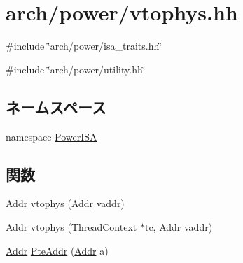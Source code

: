 \hypertarget{power_2vtophys_8hh}{
\section{arch/power/vtophys.hh}
\label{power_2vtophys_8hh}
}
{\ttfamily \#include \char`\"{}arch/power/isa\_\-traits.hh\char`\"{}}\par
{\ttfamily \#include \char`\"{}arch/power/utility.hh\char`\"{}}\par
\subsection*{ネームスペース}
\begin{DoxyCompactItemize}
\item 
namespace \hyperlink{namespacePowerISA}{PowerISA}
\end{DoxyCompactItemize}
\subsection*{関数}
\begin{DoxyCompactItemize}
\item 
\hyperlink{base_2types_8hh_af1bb03d6a4ee096394a6749f0a169232}{Addr} \hyperlink{namespacePowerISA_a3828815371ad2b0a1be60abdcb405cf9}{vtophys} (\hyperlink{base_2types_8hh_af1bb03d6a4ee096394a6749f0a169232}{Addr} vaddr)
\item 
\hyperlink{base_2types_8hh_af1bb03d6a4ee096394a6749f0a169232}{Addr} \hyperlink{namespacePowerISA_ad4bbbca3210dee66152520984c3aac6a}{vtophys} (\hyperlink{classThreadContext}{ThreadContext} $\ast$tc, \hyperlink{base_2types_8hh_af1bb03d6a4ee096394a6749f0a169232}{Addr} vaddr)
\item 
\hyperlink{base_2types_8hh_af1bb03d6a4ee096394a6749f0a169232}{Addr} \hyperlink{namespacePowerISA_a4e1f8d20048a1b7de1f6df74adbc22f3}{PteAddr} (\hyperlink{base_2types_8hh_af1bb03d6a4ee096394a6749f0a169232}{Addr} a)
\end{DoxyCompactItemize}

